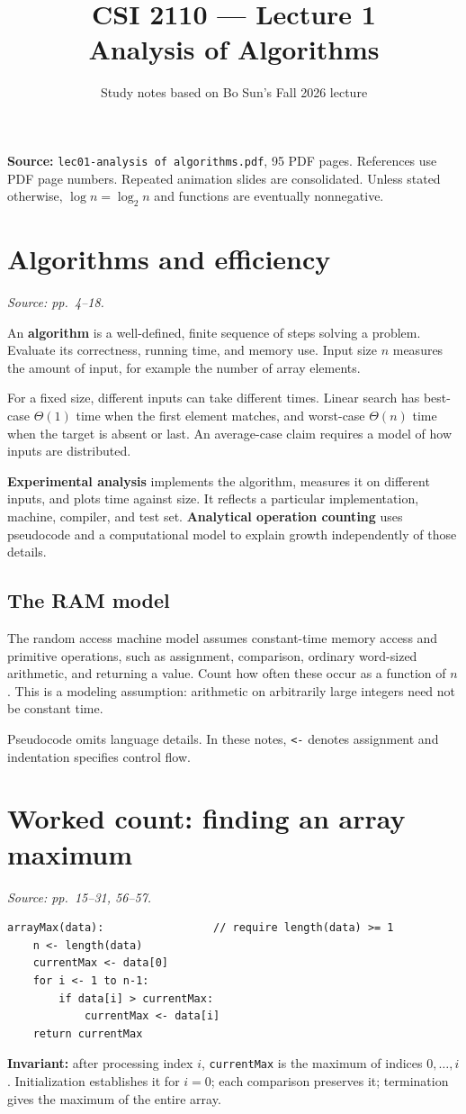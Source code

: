 \documentclass[11pt]{article}
\title{CSI 2110 --- Lecture 1\\Analysis of Algorithms}
\author{Study notes based on Bo Sun's Fall 2026 lecture}
\date{}
\begin{document}
\maketitle
\textbf{Source:} \texttt{lec01-analysis of algorithms.pdf}, 95 PDF pages. References use PDF page numbers. Repeated animation slides are consolidated. Unless stated otherwise, $\log n=\log_2 n$ and functions are eventually nonnegative.

\section{Algorithms and efficiency}
\textit{Source: pp.\ 4--18.}

An \textbf{algorithm} is a well-defined, finite sequence of steps solving a problem. Evaluate its correctness, running time, and memory use. Input size $n$ measures the amount of input, for example the number of array elements.

For a fixed size, different inputs can take different times. Linear search has best-case $\Theta(1)$ time when the first element matches, and worst-case $\Theta(n)$ time when the target is absent or last. An average-case claim requires a model of how inputs are distributed.

\textbf{Experimental analysis} implements the algorithm, measures it on different inputs, and plots time against size. It reflects a particular implementation, machine, compiler, and test set. \textbf{Analytical operation counting} uses pseudocode and a computational model to explain growth independently of those details.

\subsection{The RAM model}
The random access machine model assumes constant-time memory access and primitive operations, such as assignment, comparison, ordinary word-sized arithmetic, and returning a value. Count how often these occur as a function of $n$. This is a modeling assumption: arithmetic on arbitrarily large integers need not be constant time.

Pseudocode omits language details. In these notes, \texttt{<-} denotes assignment and indentation specifies control flow.

\section{Worked count: finding an array maximum}
\textit{Source: pp.\ 15--31, 56--57.}
\begin{lstlisting}
arrayMax(data):                 // require length(data) >= 1
    n <- length(data)
    currentMax <- data[0]
    for i <- 1 to n-1:
        if data[i] > currentMax:
            currentMax <- data[i]
    return currentMax
\end{lstlisting}
\textbf{Invariant:} after processing index $i$, \texttt{currentMax} is the maximum of indices $0,\ldots,i$. Initialization establishes it for $i=0$; each comparison preserves it; termination gives the maximum of the entire array.
\end{document}
